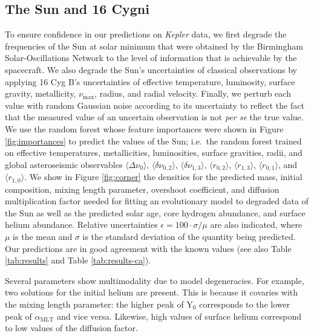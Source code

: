 \documentclass[manuscript,linenumbers]{aastex6}
\begin{document}
\subsection{The Sun and 16 Cygni}
To ensure confidence in our predictions on \emph{Kepler} data, we first degrade the frequencies of the Sun at solar minimum that were obtained by the Birmingham Solar-Oscillations Network \citep[BiSON;][]{2014MNRAS.439.2025D} to the level of information that is achievable by the spacecraft. We also degrade the Sun's uncertainties of classical observations by applying 16 Cyg B's uncertainties of effective temperature, luminosity, surface gravity, metallicity, $\nu_{\max}$, radius, and radial velocity. Finally, we perturb each value with random Gaussian noise according to its uncertainty to reflect the fact that the measured value of an uncertain observation is not \emph{per se} the true value. We use the random forest whose feature importances were shown in Figure \ref{fig:importances} to predict the values of the Sun; i.e.\ the random forest trained on effective temperatures, metallicities, luminosities, surface gravities, radii, and global asteroseismic observables $\langle \Delta\nu_0 \rangle$, $\langle \delta\nu_{0,2} \rangle$, $\langle \delta\nu_{1,3} \rangle$, $\langle r_{0,2} \rangle$, $\langle r_{1,3} \rangle$, $\langle r_{0,1} \rangle$, and $\langle r_{1,0} \rangle$. We show in Figure \ref{fig:corner} the densities for the predicted mass, initial composition, mixing length parameter, overshoot coefficient, and diffusion multiplication factor needed for fitting an evolutionary model to degraded data of the Sun as well as the predicted solar age, core hydrogen abundance, and surface helium abundance. Relative uncertainties $\epsilon=100\cdot\sigma/\mu$ are also indicated, where $\mu$ is the mean and $\sigma$ is the standard deviation of the quantity being predicted. Our predictions are in good agreement with the known values (see also Table \ref{tab:results} and Table \ref{tab:results-ca}). 

Several parameters show multimodality due to model degeneracies. For example, two solutions for the initial helium are present. This is because it covaries with the mixing length parameter: the higher peak of Y$_0$ corresponds to the lower peak of $\alpha_{\text{MLT}}$ and vice versa. Likewise, high values of surface helium correspond to low values of the diffusion factor. 
\end{document}
